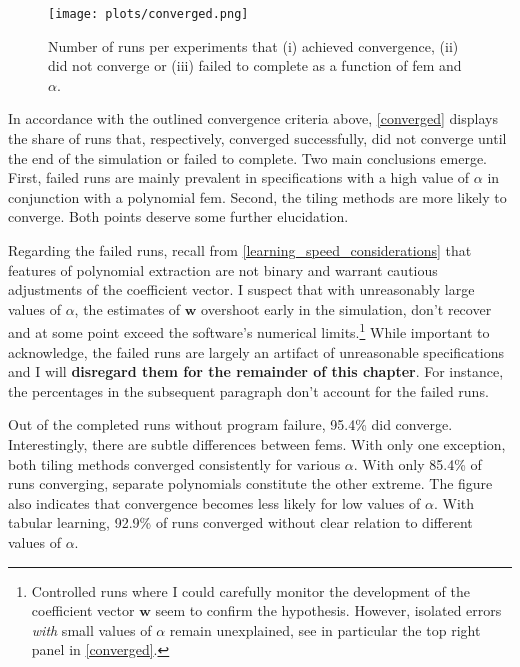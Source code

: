 \begin{figure}
	\texttt{[image: plots/converged.png]}
	\caption[Converged runs by \gls{fem} and $\alpha$]{Number of runs per experiments that (i) achieved convergence, (ii) did not converge or (iii) failed to complete as a function of \gls{fem} and $\alpha$.}
	\label{converged}
\end{figure}

In accordance with the outlined convergence criteria above, \autoref{converged} displays the share of runs that, respectively, converged successfully, did not converge until the end of the simulation or failed to complete. Two main conclusions emerge. First, failed runs are mainly prevalent in specifications with a high value of $\alpha$ in conjunction with a polynomial \gls{fem}. Second, the tiling methods are more likely to converge. Both points deserve some further elucidation.

Regarding the failed runs, recall from \autoref{learning_speed_considerations} that features of polynomial extraction are not binary and warrant cautious adjustments of the coefficient vector. I suspect that with unreasonably large values of $\alpha$, the estimates of $\boldsymbol{w}$ overshoot early in the simulation, don't recover and at some point exceed the software's numerical limits.\footnote{Controlled runs where I could carefully monitor the development of the coefficient vector $\boldsymbol{w}$ seem to confirm the hypothesis. However, isolated errors \emph{with} small values of $\alpha$ remain unexplained, see in particular the top right panel in \autoref{converged}.} While important to acknowledge, the failed runs are largely an artifact of unreasonable specifications and I will \textbf{disregard them for the remainder of this chapter}. For instance, the percentages in the subsequent paragraph don't account for the failed runs.

Out of the completed runs without program failure, 95.4\% did converge. Interestingly, there are subtle differences between \gls{fem}s. With only one exception, both tiling methods converged consistently for various $\alpha$. With only 85.4\% of runs converging, separate polynomials constitute the other extreme. The figure also indicates that convergence becomes less likely for low values of $\alpha$. With tabular learning, 92.9\% of runs converged without clear relation to different values of $\alpha$.

